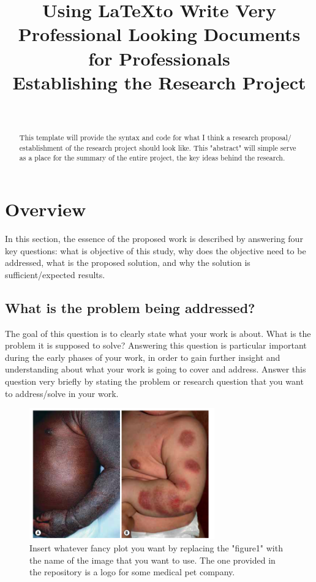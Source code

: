 \documentclass{IEEEtran}
\title{\LARGE Using \LaTeX       to Write Very Professional Looking Documents for Professionals
    \\
    \large Establishing the Research Project}
\author{
\IEEEauthorblockN{Muhammad Umar Ali} \\
\IEEEauthorblockA{\textit{School of Biomedical Engineering} \\
\textit{University of British Columbia} \\
gitUmaru@github.ca}
}
\begin{document}
    \maketitle
    \begin{abstract}
        This template will provide the syntax and code for what I think a research proposal/ establishment of the research project should look like. This "abstract" will simple serve as a place for the summary of the entire project, the key ideas behind the research.
    \end{abstract}

    \section{Overview}
    { In this section, the essence of the proposed work is described by answering four key questions: what is objective of this study, why does the objective need to be addressed, what is the proposed solution, and why the solution is sufficient/expected results.}

    \subsection{What is the problem being addressed?}
    {The goal of this question is to clearly state what your work is about.
    What is the problem it is supposed to solve? Answering this question is particular important during the early phases of your work, in order to gain further insight and understanding about what your work is going to cover and address. Answer this question very briefly by stating the problem or research question that you want to address/solve in your work.}

    \begin{figure}[htbp]
        \centering
        \includegraphics[width=8cm]{figure1}
        \caption{Insert whatever fancy plot you want by replacing the "figure1" with the name of the image that you want to use. The one provided in the repository is a logo for some medical pet company.}
    \end{figure}
\end{document}
